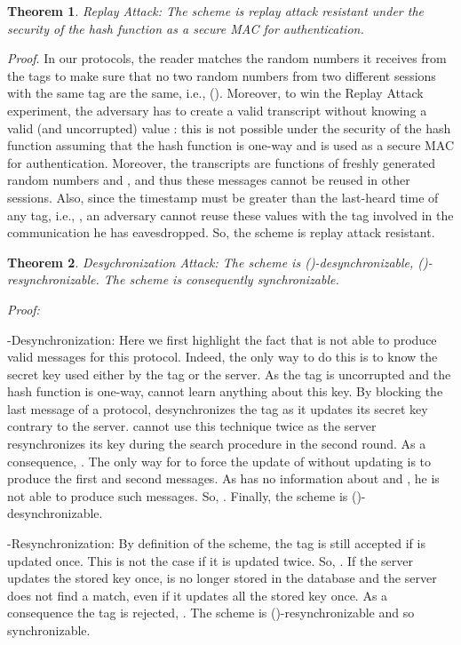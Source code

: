 \documentclass{easychair}
\newtheorem{theorem}{Theorem}{\bfseries}{\itshape}
\begin{document}
\begin{theorem}{Replay Attack:} 
The scheme is replay attack resistant under the security of the hash function as a secure MAC for authentication.
\end{theorem}
\textit{Proof}. In our protocols, the reader 
matches the random numbers  it receives from the tags to make sure that no two 
random numbers from two different sessions with the same tag are the same, i.e.,  (). Moreover, to win the Replay Attack experiment, the adversary has to create a valid transcript  without knowing a valid (and uncorrupted) value : this is not possible under the security of the hash function assuming that the hash function is one-way and is used as a secure MAC for authentication. Moreover, the transcripts are
functions of freshly generated random numbers  and , and
thus these messages cannot be reused in other sessions. Also, since the timestamp must be greater than
the last-heard time of any tag, i.e., , an adversary cannot reuse these values with the tag involved
in the communication he has eavesdropped. So, the scheme is replay attack resistant. 

\begin{theorem}{Desychronization Attack:} 
The scheme is ()-desynchronizable, ()-resynchronizable. The scheme is consequently synchronizable.
\end{theorem}
\textit{Proof:}

-Desynchronization: Here we first highlight the fact that  is not able to
produce valid messages for this protocol. Indeed, the only way to do this
is to know the secret key used either by the tag or the server. As the tag
is uncorrupted and the hash function is one-way,  cannot learn anything
about this key. By blocking the last message of a protocol,  desynchronizes
the tag as it updates its secret key contrary to the server.  cannot use this
technique twice as the server resynchronizes its key during the search procedure in the second round. As a consequence, . The only way for  to force the update of
 without updating  is to produce the first and second messages. As  has
no information about  and , he is not able to produce such messages. So,
. Finally, the scheme is ()-desynchronizable.

-Resynchronization: By definition of the scheme, the tag is still accepted if
 is updated once. This is not the case if it is updated twice. So, .
If the server updates the stored key once,  is no longer stored in the
database and the server does not find a match, even if it updates all the
stored key once. As a consequence the tag is rejected, . The scheme
is ()-resynchronizable and so synchronizable. 
\end{document}
